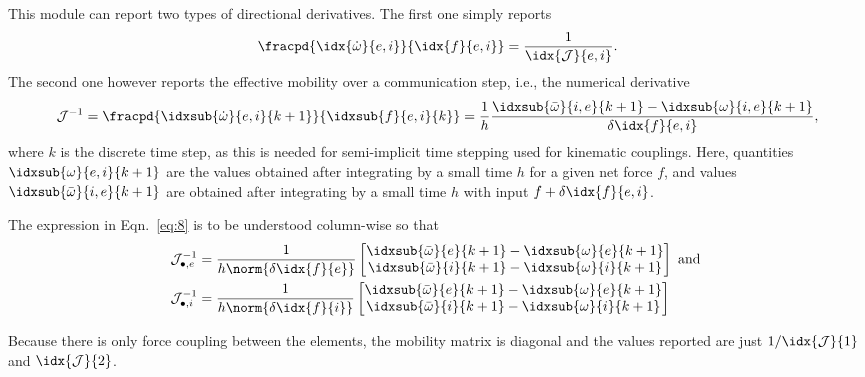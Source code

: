 \documentclass[10pt,notitlepage,abstracton]{scrartcl}
\theoremstyle{plain}
\theoremstyle{plain}
\theoremstyle{plain}
\begin{document}
This module can report two types of directional derivatives.  The first one
simply reports
\begin{equation}
  \label{eq:7}
  \fracpd{\idx{\dot{\omega}}{e,i}}{\idx{f}{e,i}} =
  \frac{1}{\idx{\mathcal{J}}{e,i}}. 
\end{equation}
The second one however reports the effective mobility over a communication
step, i.e., the numerical derivative 
\begin{equation}
  \label{eq:8}
  \mathcal{J}^{-1} = \fracpd{\idxsub{\dot{\omega}}{e,i}{k+1}}{\idxsub{f}{e,i}{k}} =
  \frac{1}{h}\frac{
    \idxsub{\bar{\omega}}{i,e}{k+1} -\idxsub{{\omega}}{i,e}{k+1}
  }{\delta \idx{f}{e,i}}, 
\end{equation}
where $k$ is the discrete time step, as this is needed for semi-implicit
time stepping used for kinematic couplings.  Here, quantities
$\idxsub{\omega}{e,i}{k+1}$ are the values obtained after integrating by a
small time $h$ for a given net force $f$, and values
$\idxsub{\bar{\omega}}{i,e}{k+1}$ are obtained after integrating by a small
time $h$ with input $f + \delta \idx{f}{e,i}$.  

The expression in Eqn.~\eqref{eq:8} is to be understood column-wise so that
\begin{equation}
  \label{eq:3}
  \begin{split}
    \mathcal{J}^{-1}_{{\bullet,e}} &= \frac{1}{h\norm{\delta \idx{f}{e}}}
    \begin{bmatrix}
      \idxsub{\bar{\omega}}{e}{k+1} -\idxsub{{\omega}}{e}{k+1} \\
      \idxsub{\bar{\omega}}{i}{k+1} -\idxsub{{\omega}}{i}{k+1} 
    \end{bmatrix}  
    \text{ and } \\
    \mathcal{J}^{-1}_{{\bullet,i}} &= \frac{1}{h\norm{\delta \idx{f}{i}}}
    \begin{bmatrix}
      \idxsub{\bar{\omega}}{e}{k+1} -\idxsub{{\omega}}{e}{k+1} \\
      \idxsub{\bar{\omega}}{i}{k+1} -\idxsub{{\omega}}{i}{k+1} 
    \end{bmatrix}  
  \end{split}
\end{equation}

Because there is only force coupling between the elements, the mobility
matrix is diagonal and the values reported are just
$1/\idx{\mathcal{J}}{1}$ and $\idx{\mathcal{J}}{2}$.
\end{document}
